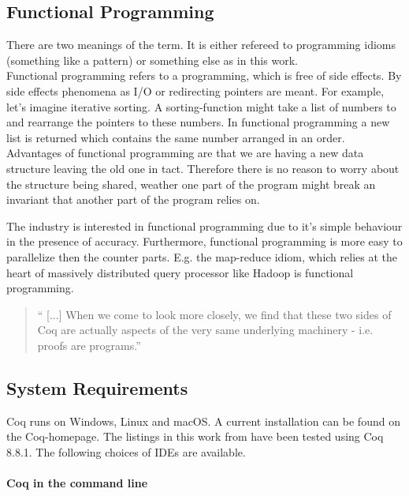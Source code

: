 \subsection{Functional Programming}

There are two meanings of the term. 
It is either refereed to programming idioms (something like a pattern) or something else as in this work.\\

Functional programming refers to a programming, which is free of side effects.
By side effects phenomena as I/O or redirecting pointers are meant. 
For example, let's imagine iterative sorting. 
A sorting-function might take a list of numbers to and rearrange the pointers to these numbers.
In functional programming a new list is returned which contains the same number arranged in an order.\\ 
Advantages of functional programming are  that we are having a new data structure leaving the old one in tact. 
Therefore there is no reason to worry about the structure being shared, weather one part of the program might break an invariant that another part of the program relies on.\par
The industry is interested in functional programming due to it's simple behaviour in the presence of accuracy.
Furthermore, functional programming is more easy to parallelize then the counter parts.
E.g. the \gls{map-reduce idiom}, which relies at the heart of massively distributed query processor like \gls{Hadoop} is functional programming. 

\begin{quote}
`` [...] When we come to look more closely, we find that these two sides of Coq are actually aspects of the very same underlying machinery - i.e. proofs are programs.'' 
\end{quote}




\subsection{System Requirements}

Coq runs on Windows, Linux and macOS.
A current installation can be found on the Coq-homepage. 
The listings in this work from \cite{PACGGHSY} have been tested using Coq 8.8.1.
The following choices of IDEs are available. 


\paragraph{Coq in the command line}


